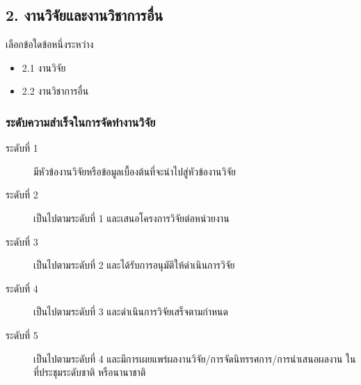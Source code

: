 \documentclass[a4paper,12pt,english]{sphinxmanual}
\begin{document}
\subsection{2. งานวิจัยและงานวิชาการอื่น}
\label{\detokenize{submission_part1:id14}}
เลือกข้อใดข้อหนึ่งระหว่าง
\begin{itemize}
\item {} 
2.1 งานวิจัย

\item {} 
2.2 งานวิชาการอื่น

\end{itemize}


\subsubsection{ระดับความสำเร็จในการจัดทำงานวิจัย}
\label{\detokenize{submission_part1:id15}}\begin{description}
\item[{ระดับที่ 1}] \leavevmode
มีหัวข้องานวิจัยหรือข้อมูลเบื้องต้นที่จะนำไปสู่หัวข้องานวิจัย

\item[{ระดับที่ 2}] \leavevmode
เป็นไปตามระดับที่ 1 และเสนอโครงการวิจัยต่อหน่วยงาน

\item[{ระดับที่ 3}] \leavevmode
เป็นไปตามระดับที่ 2 และได้รับการอนุมัติให้ดำเนินการวิจัย

\item[{ระดับที่ 4}] \leavevmode
เป็นไปตามระดับที่ 3 และดำเนินการวิจัยเสร็จตามกำหนด

\item[{ระดับที่ 5}] \leavevmode
เป็นไปตามระดับที่ 4 และมีการเผยแพร่ผลงานวิจัย/การจัดนิทรรศการ/การนำเสนอผลงาน ในที่ประชุมระดับชาติ หรือนานาชาติ

\end{description}
\end{document}
